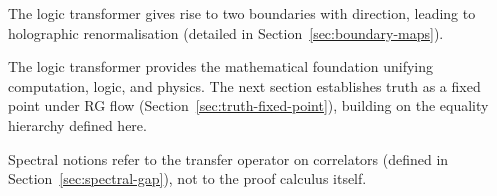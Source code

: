 \begin{definition}
\label{def:holographic-renorm}
The logic transformer gives rise to two boundaries with direction, leading to holographic renormalisation (detailed in Section~\ref{sec:boundary-maps}).
\end{definition}

The logic transformer provides the mathematical foundation unifying computation, logic, and physics. The next section establishes truth as a fixed point under RG flow (Section~\ref{sec:truth-fixed-point}), building on the equality hierarchy defined here.

Spectral notions refer to the transfer operator on correlators (defined in Section~\ref{sec:spectral-gap}), not to the proof calculus itself.
